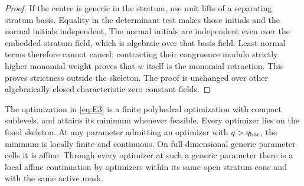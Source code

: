 \begin{proof}
If the centre is generic in the stratum, use unit lifts of a
separating stratum basis.  Equality in the determinant test makes
those initials and the normal initials independent.  The normal
initials are independent even over the embedded stratum field,
which is algebraic over that basis field.  Least normal terms
therefore cannot cancel; contracting their congruence modulo
strictly higher monomial weight proves that \(w\) itself is the
monomial retraction.  This proves strictness outside the skeleton.
The proof is unchanged over other algebraically closed
characteristic-zero constant fields.
\end{proof}

\begin{proposition}
\label{c:optimization}
The optimization in \eqref{eq:E3} is a finite polyhedral
optimization with compact sublevels, and attains its minimum
whenever feasible.  Every optimizer lies on the fixed skeleton.
At any parameter admitting an optimizer with \(q>q_{\rm bar}\),
the minimum is locally finite and continuous.  On full-dimensional
generic parameter cells it is affine.  Through every optimizer at
such a generic parameter there is a local affine continuation by
optimizers within its same open stratum cone and with the same
active mask.
\end{proposition}

